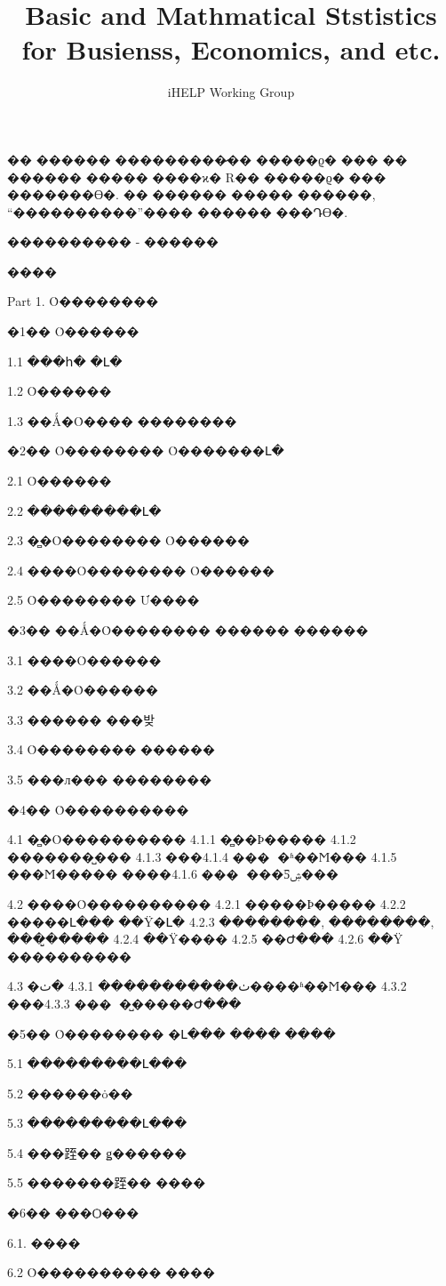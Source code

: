 \documentclass{article}
\begin{document}
\title{Basic and Mathmatical Ststistics for Busienss, Economics, and etc.}
\author{iHELP Working Group}


�� ������ ���������̷�� �����ϱ� ��� �� ������ ����� ����ϰ� R�� �����ϱ� ��� �������ϴ�.
�� ������ ����� ������, "`����������"'���� ������ ���Դϴ�.   

���������� - ������

����

Part 1. Ȯ��������

�1�� Ȯ������

1.1 ���հ� �Լ�

1.2 Ȯ������

1.3 ��Ǻ�Ȯ���� ��������

�2�� Ȯ�������� Ȯ�������Լ�

2.1 Ȯ������

2.2 ���������Լ�

2.3 �̻�Ȯ�������� Ȯ������

2.4 ����Ȯ�������� Ȯ������

2.5 Ȯ�������� Ư����

�3�� ��Ǻ�Ȯ�������� ������ ������

3.1 ����Ȯ������

3.2 ��Ǻ�Ȯ������

3.3 ������ ���밪

3.4 Ȯ�������� ������

3.5 ���л��� ��������

�4�� Ȯ����������

4.1 �̻�Ȯ����������
4.1.1 �̻��Ϸ�����
4.1.2 �������̺���
4.1.3 ���׺���
4.1.4 �ʱ��Ϻ���
4.1.5 ���Ϻ����� ����׺���
4.1.6 ���Ƽۺ���

4.2 ����Ȯ����������
4.2.1 �����Ϸ�����
4.2.2 �����Լ��� ��Ÿ�Լ�
4.2.3 ��������, ��������, ���̺�����
4.2.4 ��Ÿ����
4.2.5 ��Ժ���
4.2.6 ��Ÿ ����������

4.3 �ٺ�����������
4.3.1 �ٺ����ʱ��Ϻ���
4.3.2 ���׺���
4.3.3 �̺�����Ժ���

�5�� Ȯ�������� �Լ��� ���� ����

5.1 ���������Լ���

5.2 ������ȯ��

5.3 ���������Լ���

5.4 ���跮�� ǥ������

5.5 �������跮�� ����

�6�� ���Ѻ���

6.1. ����

6.2 Ȯ���������� ����
\end{document}

